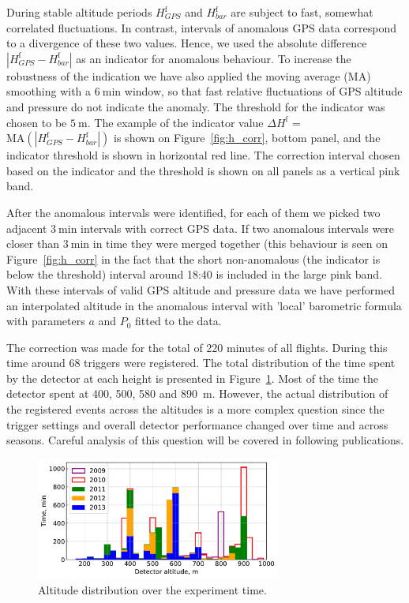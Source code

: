 \documentclass[universe,article,submit,moreauthors,pdftex]{Definitions/mdpi}
\begin{document}
During stable altitude periods $H_{GPS}^{\textrm{f}}$ and $H_{bar}^{\textrm{f}}$ are subject to fast, somewhat correlated fluctuations. In contrast, intervals of anomalous GPS data correspond to a divergence of these two values. Hence, we used the absolute difference $|H_{GPS}^{\textrm{f}} - H_{bar}^{\textrm{f}}|$ as an indicator for anomalous behaviour. To increase the robustness of the indication we have also applied the moving average (MA) smoothing with a $6~\textrm{min}$ window, so that fast relative fluctuations of GPS altitude and pressure do not indicate the anomaly. The threshold for the indicator was chosen to be $5~\textrm{m}$. The example of the indicator value $\Delta H^\textrm{f}$ = $\textrm{MA}(|H_{GPS}^{\textrm{f}} - H_{bar}^{\textrm{f}}|)$ is shown on Figure~\ref{fig:h_corr}, bottom panel, and the indicator threshold is shown in horizontal red line. The correction interval chosen based on the indicator and the threshold is shown on all panels as a vertical pink band.

After the anomalous intervals were identified, for each of them we picked two adjacent $3~\textrm{min}$ intervals with correct GPS data. If two anomalous intervals were closer than $3~\textrm{min}$ in time they were merged together (this behaviour is seen on Figure~\ref{fig:h_corr} in the fact that the short non-anomalous (the indicator is below the threshold) interval around 18:40 is included in the large pink band. With these intervals of valid GPS altitude and pressure data we have performed an interpolated altitude in the anomalous interval with 'local' barometric formula with parameters $a$ and $P_0$ fitted to the data.

The correction was made for the total of 220 minutes of all flights. During this time around 68 triggers were registered. The total distribution of the time spent by the detector at each height is presented in Figure~\ref{fig:time_on_altitude}. Most of the time the detector spent at 400, 500, 580 and 890~m. However, the actual distribution of the registered events across the altitudes is a more complex question since the trigger settings and overall detector performance changed over time and across seasons. Careful analysis of this question will be covered in following publications.

\begin{figure}[tb]
    \includegraphics[width=19pc]{figs/time_on_altitude_c.pdf}%
    \caption{Altitude distribution over the experiment time.}
    \label{fig:time_on_altitude}
\end{figure}
\end{document}
